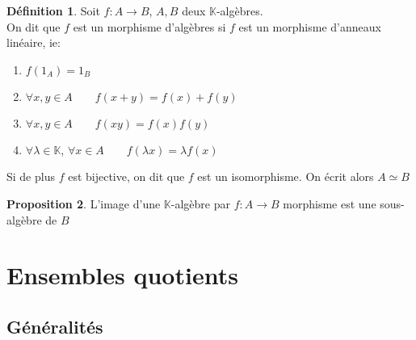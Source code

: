\documentclass[10pt,a4paper]{article}
\theoremstyle{definition}
\newtheorem{proposition}{Proposition}[section]
\newtheorem{definition}[proposition]{Définition}
\begin{document}
\pagebreak

\begin{definition}
Soit $f: A \to B$, $A, B$ deux $\mathbb{K}$-algèbres. \\
On dit que $f$ est un morphisme d'algèbres si $f$ est un morphisme d'anneaux linéaire, ie:
\begin{enumerate}
\item $f(1_A) = 1_B$ 
\item $\forall x, y \in A \qquad f(x + y) = f(x) + f(y)$
\item $\forall x, y \in A \qquad f(xy) = f(x) f(y)$ 
\item $\forall \lambda \in \mathbb{K}$, $\forall x \in A \qquad f(\lambda x) = \lambda f(x)$
\end{enumerate}
Si de plus $f$ est bijective, on dit que $f$ est un isomorphisme. On écrit alors $A \simeq B$
\end{definition}
\begin{proposition}
L'image d'une $\mathbb{K}$-algèbre par $f: A \to B$ morphisme est une sous-algèbre de $B$
\end{proposition}

\section{Ensembles quotients}
\subsection{Généralités}
\end{document}
